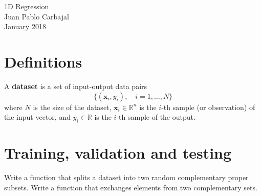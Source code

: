 \documentclass[10pt,english,final,a4paper]{exam}
\begin{document}
\begin{center}
{\Large 1D Regression}\\
Juan Pablo Carbajal\\
January 2018
\end{center}

\vspace{1.5em}


\section{Definitions}
A \textbf{dataset} is a set of input-output data pairs 
\begin{equation}
\lbrace \left(\bm{x}_i, y_i\right), \quad i = 1, \ldots, N\rbrace
\end{equation}
\noindent where $N$ is the size of the dataset, $\bm{x}_i \in \mathbb{R}^n$ is the $i$-th sample (or observation) of the input vector, and $y_i \in \mathbb{R}$
is the $i$-th sample of the output.

\section{Training, validation and testing}
\begin{questions}
Write a function that splits a dataset into two random complementary proper subsets.
Write a function that exchanges elements from two complementary sets.
\end{questions}
\end{document}

